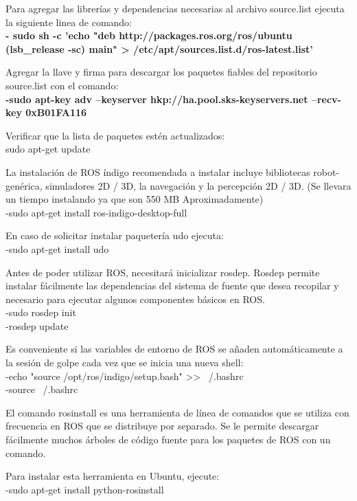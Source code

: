 \documentclass[12pt,letterpaper]{report}
\begin{document}
\begin{flushleft}
\begin{flushleft}
Para agregar las librerías y dependencias necesarias al archivo source.list ejecuta la siguiente linea de comando:\\
\textbf{- sudo sh -c 'echo "deb http://packages.ros.org/ros/ubuntu (lsb_release -sc) main" > /etc/apt/sources.list.d/ros-latest.list'
}
\begin{flushleft}
Agregar la llave y firma para descargar los paquetes fiables del repositorio source.list con el comando:\\\textbf{ -sudo apt-key adv --keyserver hkp://ha.pool.sks-keyservers.net --recv-key 0xB01FA116
}
\begin{flushleft}
Verificar que la lista de paquetes estén actualizados:\\
sudo apt-get update
\begin{flushleft}
La instalación de ROS índigo recomendada a instalar incluye bibliotecas robot-genérica, simuladores 2D / 3D, la navegación y la percepción 2D / 3D. (Se llevara un tiempo instalando ya que son 550 MB Aproximadamente)\\
-sudo apt-get install ros-indigo-desktop-full
\begin{flushleft}
En caso de solicitar instalar paquetería udo ejecuta:\\
-sudo apt-get install udo
\begin{flushleft}
Antes de poder utilizar ROS, necesitará inicializar rosdep. Rosdep permite instalar fácilmente las dependencias del sistema de fuente que desea recopilar y necesario para ejecutar algunos componentes básicos en ROS.\\
-sudo rosdep init\\
-rosdep update
\begin{flushleft}
Es conveniente si las variables de entorno de ROS se añaden automáticamente a la sesión de golpe cada vez que se inicia una nueva shell:\\
-echo "source /opt/ros/indigo/setup.bash" >> ~/.bashrc\\
-source ~/.bashrc\begin{flushleft}
El comando rosinstall es una herramienta de línea de comandos que se utiliza con frecuencia en ROS que se distribuye por separado. Se le permite descargar fácilmente muchos árboles de código fuente para los paquetes de ROS con un comando.

Para instalar esta herramienta en Ubuntu, ejecute:\\
-sudo apt-get install python-rosinstall
\end{flushleft}
\end{flushleft}
\end{flushleft}
\end{flushleft}
\end{flushleft}
\end{flushleft}
\end{flushleft}
\end{flushleft}
\end{flushleft}
\end{document}
